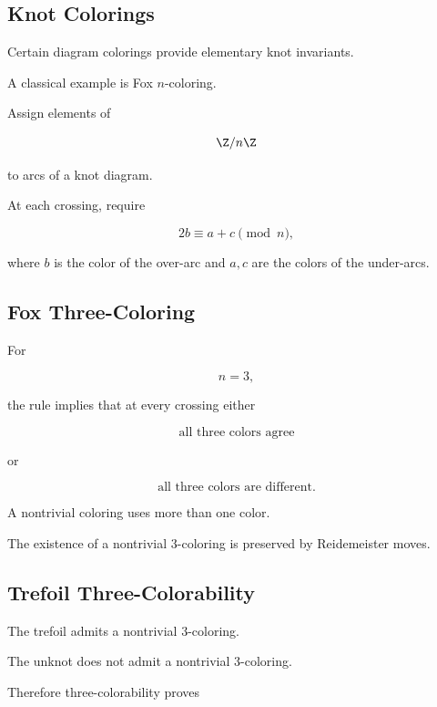 \subsection{Knot Colorings}
\label{subsec:knot-colorings}

Certain diagram colorings provide elementary knot invariants.

A classical example is Fox \(n\)-coloring.

Assign elements of

\[
\Z/n\Z
\]

to arcs of a knot diagram.

At each crossing, require

\[
\boxed{
2b\equiv a+c\pmod n,
}
\]

where \(b\) is the color of the over-arc and \(a,c\) are the colors of the
under-arcs.

\subsection{Fox Three-Coloring}
\label{subsec:fox-three-coloring}

For

\[
n=3,
\]

the rule implies that at every crossing either

\[
\boxed{
\text{all three colors agree}
}
\]

or

\[
\boxed{
\text{all three colors are different}.
}
\]

A nontrivial coloring uses more than one color.

The existence of a nontrivial \(3\)-coloring is preserved by Reidemeister
moves.

\subsection{Trefoil Three-Colorability}
\label{subsec:trefoil-three-coloring}

The trefoil admits a nontrivial \(3\)-coloring.

The unknot does not admit a nontrivial \(3\)-coloring.

Therefore three-colorability proves

